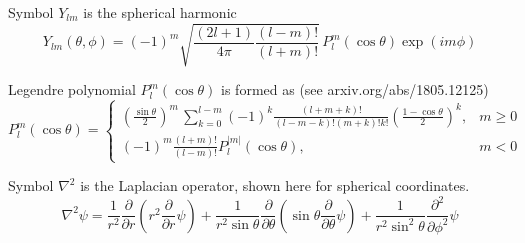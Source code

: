 Symbol $Y_{lm}$ is the spherical harmonic
\begin{equation*}
Y_{lm}(\theta,\phi)=(-1)^m
\sqrt{\frac{(2l+1)}{4\pi}
\frac{(l-m)!}{(l+m)!}}\,
P_l^m(\cos\theta)\exp(im\phi)
\end{equation*}

Legendre polynomial $P_l^m(\cos\theta)$ is formed as (see arxiv.org/abs/1805.12125)
\begin{equation*}
P_l^m(\cos\theta)=\begin{cases}
\displaystyle
\left(\frac{\sin\theta}{2}\right)^m\,\sum_{k=0}^{l-m}
(-1)^k\frac{(l+m+k)!}{(l-m-k)!(m+k)!k!}
\left(\frac{1-\cos\theta}{2}\right)^k, & m\ge0
\\[4ex]
\displaystyle
(-1)^m\frac{(l+m)!}{(l-m)!}P_l^{|m|}(\cos\theta), & m<0
\end{cases}
\end{equation*}

Symbol $\nabla^2$ is the Laplacian operator, shown here for spherical coordinates.
\begin{equation*}
\nabla^2\psi=\frac{1}{r^2}\frac{\partial}{\partial r}
\left(r^2\frac{\partial}{\partial r}\psi\right)
+
\frac{1}{r^2\sin\theta}\frac{\partial}{\partial\theta}
\left(\sin\theta\frac{\partial}{\partial\theta}\psi\right)
+
\frac{1}{r^2\sin^2\theta}\frac{\partial^2}{\partial\phi^2}\psi
\end{equation*}


